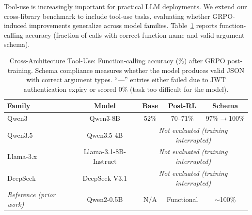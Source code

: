 \documentclass{article}
\begin{document}
Tool-use is increasingly important for practical LLM deployments. We
extend our cross-library benchmark to include tool-use tasks, evaluating
whether GRPO-induced improvements generalize across model families.
Table~\ref{tab:tool_use_cross_arch} reports function-calling accuracy
(fraction of calls with correct function name and valid argument schema).

\begin{table}[htbp]
\centering
\caption{Cross-Architecture Tool-Use: Function-calling accuracy (\%)
after GRPO post-training. Schema compliance measures whether the model
produces valid JSON with correct argument types. ``---'' entries either
failed due to JWT authentication expiry or scored 0\% (task too
difficult for the model).}
\label{tab:tool_use_cross_arch}
\small
\begin{tabular}{@{}lcccc@{}}
\toprule
\textbf{Family} & \textbf{Model} & \textbf{Base} & \textbf{Post-RL} & \textbf{Schema} \\
\midrule
Qwen3 & Qwen3-8B & 52\% & 70--71\% & 97\%$\to$100\% \\
Qwen3.5 & Qwen3.5-4B & \multicolumn{3}{c}{\textit{Not evaluated (training interrupted)}} \\
Llama-3.x & Llama-3.1-8B-Instruct & \multicolumn{3}{c}{\textit{Not evaluated (training interrupted)}} \\
DeepSeek & DeepSeek-V3.1 & \multicolumn{3}{c}{\textit{Not evaluated (training interrupted)}} \\
\midrule
\textit{Reference (prior work)} & Qwen2-0.5B & N/A & Functional & $\sim$100\% \\
\bottomrule
\end{tabular}
\end{table}

\end{document}
